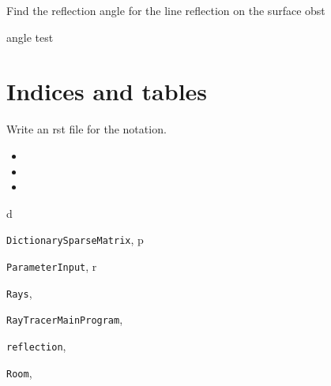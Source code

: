 \documentclass[letterpaper,10pt,english]{sphinxmanual}
\begin{document}
\begin{fulllineitems}
\label{index:reflection.refangle}
Find the reflection angle for the line reflection on the surface obst

\end{fulllineitems}


\begin{fulllineitems}
\label{index:reflection.test3}
angle test

\end{fulllineitems}



\chapter{Indices and tables}
\label{index:indices-and-tables}
Write an rst file for the notation.
\begin{itemize}
\item {} 

\item {} 

\item {} 

\end{itemize}


\renewcommand{\indexname}{Python Module Index}
\begin{theindex}
\def\bigletter#1{{\Large\sffamily#1}\nopagebreak\vspace{1mm}}
\bigletter{d}
\item {\texttt{DictionarySparseMatrix}}, \pageref{index:module-DictionarySparseMatrix}
\indexspace
\bigletter{p}
\item {\texttt{ParameterInput}}, \pageref{index:module-ParameterInput}
\indexspace
\bigletter{r}
\item {\texttt{Rays}}, \pageref{index:module-Rays}
\item {\texttt{RayTracerMainProgram}}, \pageref{index:module-RayTracerMainProgram}
\item {\texttt{reflection}}, \pageref{index:module-reflection}
\item {\texttt{Room}}, \pageref{index:module-Room}
\end{theindex}

\renewcommand{\indexname}{Index}
\printindex
\end{document}
